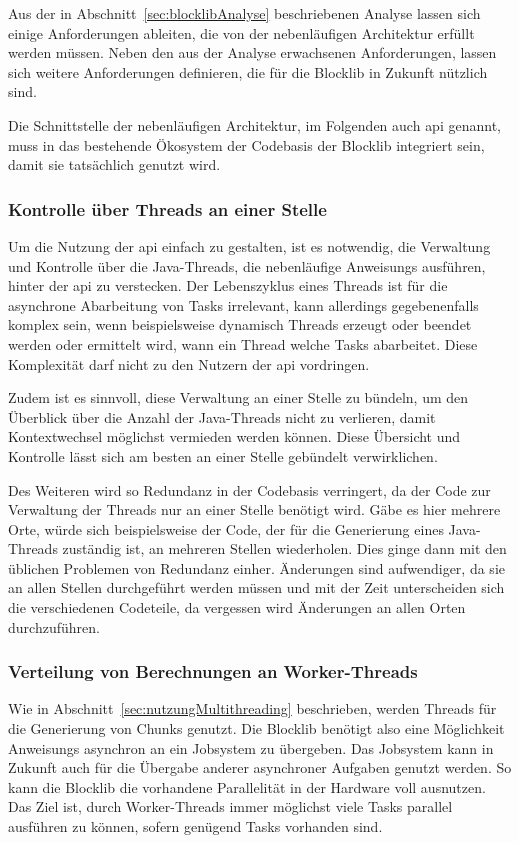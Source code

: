 Aus der in Abschnitt~\ref{sec:blocklibAnalyse} beschriebenen Analyse lassen sich einige Anforderungen ableiten, die von der nebenläufigen Architektur erfüllt werden müssen. Neben den aus der Analyse erwachsenen Anforderungen, lassen sich weitere Anforderungen definieren, die für die Blocklib in Zukunft nützlich sind.

Die Schnittstelle der nebenläufigen Architektur, im Folgenden auch \acs{api} genannt, muss in das bestehende Ökosystem der Codebasis der Blocklib integriert sein, damit sie tatsächlich genutzt wird.

\subsubsection{Kontrolle über Threads an einer Stelle}
Um die Nutzung der \acs{api} einfach zu gestalten, ist es notwendig, die Verwaltung und Kontrolle über die Java-Threads, die nebenläufige \glspl{Anweisung} ausführen, hinter der \acs{api} zu verstecken. Der Lebenszyklus eines Threads ist für die asynchrone Abarbeitung von Tasks irrelevant, kann allerdings gegebenenfalls komplex sein, wenn beispielsweise dynamisch Threads erzeugt oder beendet werden oder ermittelt wird, wann ein Thread welche Tasks abarbeitet. Diese Komplexität darf nicht zu den Nutzern der \acs{api} vordringen.

Zudem ist es sinnvoll, diese Verwaltung an einer Stelle zu bündeln, um den Überblick über die Anzahl der Java-Threads nicht zu verlieren, damit Kontextwechsel möglichst vermieden werden können. Diese Übersicht und Kontrolle lässt sich am besten an einer Stelle gebündelt verwirklichen.

Des Weiteren wird so Redundanz in der Codebasis verringert, da der Code zur Verwaltung der Threads nur an einer Stelle benötigt wird. Gäbe es hier mehrere Orte, würde sich beispielsweise der Code, der für die Generierung eines Java-Threads zuständig ist, an mehreren Stellen wiederholen. Dies ginge dann mit den üblichen Problemen von Redundanz einher. Änderungen sind aufwendiger, da sie an allen Stellen durchgeführt werden müssen und mit der Zeit unterscheiden sich die verschiedenen Codeteile, da vergessen wird Änderungen an allen Orten durchzuführen.

\subsubsection{Verteilung von Berechnungen an Worker-Threads}
Wie in Abschnitt~\ref{sec:nutzungMultithreading} beschrieben, werden Threads für die Generierung von Chunks genutzt. Die Blocklib benötigt also eine Möglichkeit \glspl{Anweisung} asynchron an ein Jobsystem zu übergeben. Das Jobsystem kann in Zukunft auch für die Übergabe anderer asynchroner Aufgaben genutzt werden. So kann die Blocklib die vorhandene Parallelität in der Hardware voll ausnutzen. Das Ziel ist, durch Worker-Threads immer möglichst viele Tasks parallel ausführen zu können, sofern genügend Tasks vorhanden sind.

